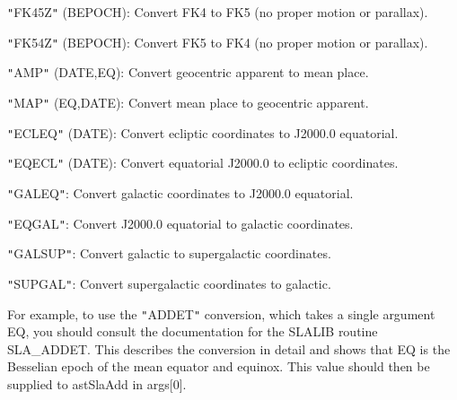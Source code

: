 \documentclass[twoside,11pt]{article}
\begin{document}
{{{         \sstitem
         {\tt{"}}FK45Z{\tt{"}} (BEPOCH): Convert FK4 to FK5 (no proper motion or parallax).

         \sstitem
         {\tt{"}}FK54Z{\tt{"}} (BEPOCH): Convert FK5 to FK4 (no proper motion or parallax).

         \sstitem
         {\tt{"}}AMP{\tt{"}} (DATE,EQ): Convert geocentric apparent to mean place.

         \sstitem
         {\tt{"}}MAP{\tt{"}} (EQ,DATE): Convert mean place to geocentric apparent.

         \sstitem
         {\tt{"}}ECLEQ{\tt{"}} (DATE): Convert ecliptic coordinates to J2000.0 equatorial.

         \sstitem
         {\tt{"}}EQECL{\tt{"}} (DATE): Convert equatorial J2000.0 to ecliptic coordinates.

         \sstitem
         {\tt{"}}GALEQ{\tt{"}}: Convert galactic coordinates to J2000.0 equatorial.

         \sstitem
         {\tt{"}}EQGAL{\tt{"}}: Convert J2000.0 equatorial to galactic coordinates.

         \sstitem
         {\tt{"}}GALSUP{\tt{"}}: Convert galactic to supergalactic coordinates.

         \sstitem
         {\tt{"}}SUPGAL{\tt{"}}: Convert supergalactic coordinates to galactic.

      }
      For example, to use the {\tt{"}}ADDET{\tt{"}} conversion, which takes a single
      argument EQ, you should consult the documentation for the SLALIB
      routine SLA\_ADDET. This describes the conversion in detail and
      shows that EQ is the Besselian epoch of the mean equator and
      equinox.
      This value should then be supplied to astSlaAdd in args[0].
   }
}
\end{document}
